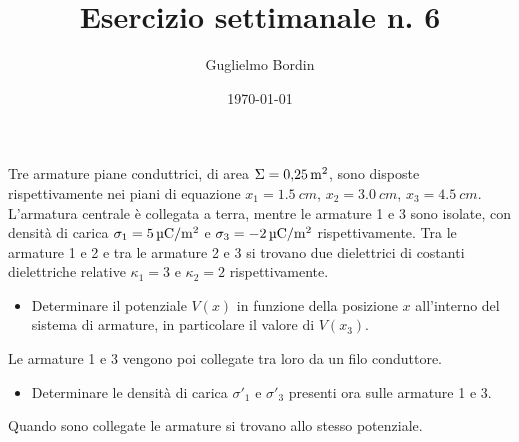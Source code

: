 \documentclass[10pt]{gulartcl}
\title{Esercizio settimanale n. 6}
\author{Guglielmo Bordin}
\date{\today}
\begin{document}
\maketitle

\noindent
Tre armature piane conduttrici, di area $\Sigma = \qty{0.25}{m\squared}$,
sono disposte rispettivamente nei piani di equazione $x_{1} =
\qty{1.5}{cm}$, $x_{2} = \qty{3.0}{cm}$, $x_{3} = \qty{4.5}{cm}$.
L’armatura centrale è collegata a terra, mentre le armature 1 e 3 sono
isolate, con densità di carica $\sigma_{1} = \qty{5}{\micro C \per
m\squared}$ e $\sigma_{3} = \qty{-2}{\micro C \per m\squared}$
rispettivamente. Tra le armature 1 e 2 e tra le armature 2 e 3 si trovano
due dielettrici di costanti dielettriche relative $\kappa_{1} = 3$ e
$\kappa_{2} = 2$ rispettivamente.
\begin{itemize}
    \item Determinare il potenziale $V(x)$ in funzione della posizione $x$
        all’interno del sistema di armature, in particolare il valore di
        $V(x_{3})$.
\end{itemize}
Le armature 1 e 3 vengono poi collegate tra loro da un filo conduttore.
\begin{itemize}
    \item Determinare le densità di carica $\sigma'_{1}$ e $\sigma'_{3}$
        presenti ora sulle armature 1 e 3. 
\end{itemize}
\begin{hint}
Quando sono collegate le armature si trovano allo stesso potenziale.
\end{hint}

\bigbreak

\newcommand\platewidth{0.1}
\newcommand\capacitor[1]{
    \begin{scope}[xshift=#1cm]
        \draw (-\platewidth, 0) rectangle (0, 3);
        \draw (1.5 - \platewidth / 2, 0)
              rectangle
              (1.5 + \platewidth / 2, 3);
        \draw (3, 0) rectangle (3 + \platewidth, 3);

        \fill[fill=gray!70] (0, 0) rectangle (1.5 - \platewidth / 2, 3);
        \fill[fill=gray!30] (1.5 + \platewidth / 2, 0) rectangle (3, 3);

        \draw (1.5, 0) -- ++(0, -0.8)
            ++(-0.4, 0) -- ++(0.8, 0) 
            ++(-0.65, -0.2) -- ++(0.5, 0)
            ++(-0.35, -0.2) -- ++(0.2, 0);

        \node at (0.75 - \platewidth / 4, 2) {$\kappa_{1}$}; 
        \node at (2.25 + \platewidth / 4, 2) {$\kappa_{2}$};
    \end{scope}
}
\end{document}
